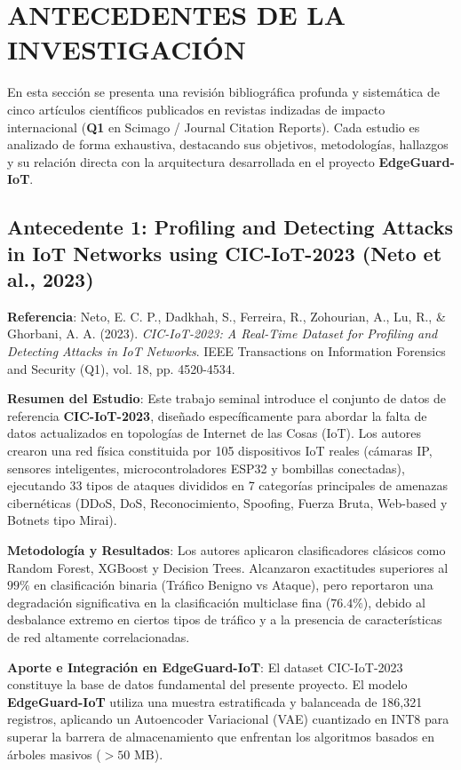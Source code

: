 \section{ANTECEDENTES DE LA INVESTIGACIÓN}

En esta sección se presenta una revisión bibliográfica profunda y sistemática de cinco artículos científicos publicados en revistas indizadas de impacto internacional (\textbf{Q1} en Scimago / Journal Citation Reports). Cada estudio es analizado de forma exhaustiva, destacando sus objetivos, metodologías, hallazgos y su relación directa con la arquitectura desarrollada en el proyecto \textbf{EdgeGuard-IoT}.

\subsection{Antecedente 1: Profiling and Detecting Attacks in IoT Networks using CIC-IoT-2023 (Neto et al., 2023)}
\textbf{Referencia}: Neto, E. C. P., Dadkhah, S., Ferreira, R., Zohourian, A., Lu, R., \& Ghorbani, A. A. (2023). \textit{CIC-IoT-2023: A Real-Time Dataset for Profiling and Detecting Attacks in IoT Networks}. IEEE Transactions on Information Forensics and Security (Q1), vol. 18, pp. 4520-4534.

\textbf{Resumen del Estudio}:
Este trabajo seminal introduce el conjunto de datos de referencia \textbf{CIC-IoT-2023}, diseñado específicamente para abordar la falta de datos actualizados en topologías de Internet de las Cosas (IoT). Los autores crearon una red física constituida por 105 dispositivos IoT reales (cámaras IP, sensores inteligentes, microcontroladores ESP32 y bombillas conectadas), ejecutando 33 tipos de ataques divididos en 7 categorías principales de amenazas cibernéticas (DDoS, DoS, Reconocimiento, Spoofing, Fuerza Bruta, Web-based y Botnets tipo Mirai).

\textbf{Metodología y Resultados}:
Los autores aplicaron clasificadores clásicos como Random Forest, XGBoost y Decision Trees. Alcanzaron exactitudes superiores al $99\%$ en clasificación binaria (Tráfico Benigno vs Ataque), pero reportaron una degradación significativa en la clasificación multiclase fina ($76.4\%$), debido al desbalance extremo en ciertos tipos de tráfico y a la presencia de características de red altamente correlacionadas.

\textbf{Aporte e Integración en EdgeGuard-IoT}:
El dataset CIC-IoT-2023 constituye la base de datos fundamental del presente proyecto. El modelo \textbf{EdgeGuard-IoT} utiliza una muestra estratificada y balanceada de 186,321 registros, aplicando un Autoencoder Variacional (VAE) cuantizado en INT8 para superar la barrera de almacenamiento que enfrentan los algoritmos basados en árboles masivos ($>50\text{ MB}$).


